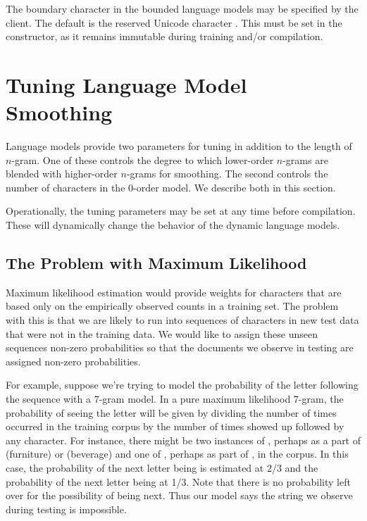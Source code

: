 The boundary character in the bounded language models may be specified
by the client.  The default is the reserved Unicode character
.  This must be set in the constructor, as it remains
immutable during training and/or compilation.



\section{Tuning Language Model Smoothing}\label{section:char-lm-smoothing}

Language models provide two parameters for tuning in addition to the
length of $n$-gram.  One of these controls the degree to which
lower-order $n$-grams are blended with higher-order $n$-grams for
smoothing.  The second controls the number of characters in the
0-order model.  We describe both in this section.

Operationally, the tuning parameters may be set at any time before
compilation.  These will dynamically change the behavior of the
dynamic language models.

\subsection{The Problem with Maximum Likelihood}

Maximum likelihood estimation would provide weights for characters
that are based only on the empirically observed counts in a training
set.  The problem with this is that we are likely to run into
sequences of characters in new test data that were not in the training
data.  We would like to assign these unseen sequences non-zero
probabilities so that the documents we observe in testing are assigned
non-zero probabilities.

For example, suppose we're trying to model the probability of the
letter  following the sequence  with a 7-gram model.  In a pure maximum likelihood 7-gram, the
probability of seeing the letter  will be given by
dividing the number of times  occurred in the
training corpus by the number of times  showed
up followed by any character.  For instance, there might be two
instances of , perhaps as a part of
 (furniture) or 
(beverage) and one of , perhaps as part of
, in the corpus.  In this case, the
probability of the next letter being  is estimated at
2/3 and the probability of the next letter being  at
1/3.  Note that there is no probability left over for the possibility
of  being next.  Thus our model says the string we
observe during testing is impossible.  


